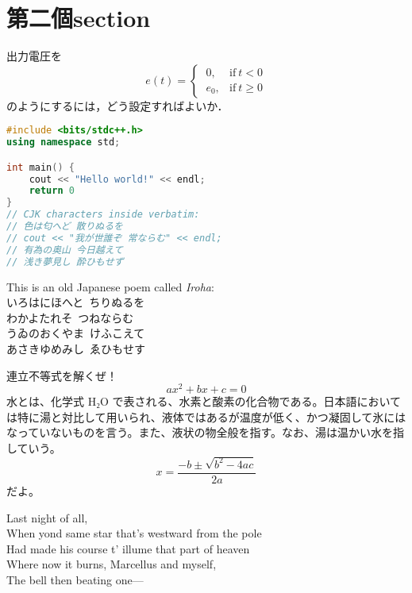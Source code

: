 \section{第二個section}

\begin{tcolorbox}[colback=myteal!5!white,colframe=myteal!75!black,title=\textsf{課題2}]
	出力電圧を
	\begin{equation*}
		e(t) =
		\begin{cases}
			\ 0,   & \text{if}\ t < 0   \\
			\ e_0, & \text{if}\ t \ge 0
		\end{cases}
	\end{equation*}
	のようにするには，どう設定すればよいか．
\end{tcolorbox}

\begin{lstlisting}[language=C++]
#include <bits/stdc++.h>
using namespace std;

int main() {
	cout << "Hello world!" << endl;
	return 0
}
// CJK characters inside verbatim:
// 色は匂へど 散りぬるを
// cout << "我が世誰ぞ 常ならむ" << endl;
// 有為の奥山 今日越えて
// 浅き夢見し 酔ひもせず
\end{lstlisting}

This is an old Japanese poem called \emph{Iroha}: \\
いろはにほへと\ ちりぬるを \\
わかよたれそ\ つねならむ \\
うゐのおくやま\ けふこえて \\
あさきゆめみし\ ゑひもせす

連立不等式を解くぜ！
\begin{equation}
	ax^2 + bx + c = 0
\end{equation}
水とは、化学式 H₂O で表される、水素と酸素の化合物である。日本語においては特に湯と対比して用いられ、液体ではあるが温度が低く、かつ凝固して氷にはなっていないものを言う。また、液状の物全般を指す。なお、湯は温かい水を指していう。
\begin{equation}
	x = \frac{-b \pm \sqrt{b^2 - 4ac}}{2a}
\end{equation}
だよ。

Last night of all, \\
When yond same star that's westward from the pole \\
Had made his course t' illume that part of heaven \\
Where now it burns, Marcellus and myself, \\
The bell then beating one—
